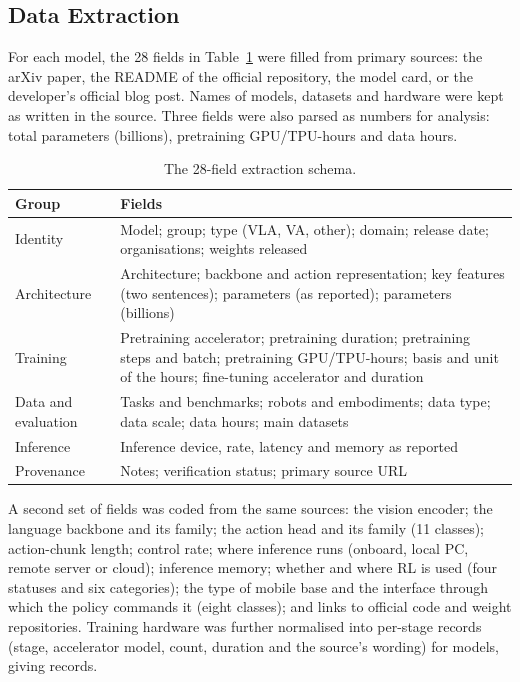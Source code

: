 \documentclass[applsci,review,submit,pdftex,oneauthor]{Definitions/mdpi}
\begin{document}
\subsection{Data Extraction}

For each model, the 28 fields in Table~\ref{tab:schema} were filled from primary sources: the arXiv paper, the README of the official repository, the model card, or the developer's official blog post. Names of models, datasets and hardware were kept as written in the source. Three fields were also parsed as numbers for analysis: total parameters (billions), pretraining GPU/TPU-hours and data hours.

\begin{table}[H]
\caption{The 28-field extraction schema.\label{tab:schema}}
\small
\begin{tabularx}{\textwidth}{@{}l X@{}}
\toprule
\textbf{Group} & \textbf{Fields}\\
\midrule
Identity & Model; group; type (VLA, VA, other); domain; release date; organisations; weights released\\
Architecture & Architecture; backbone and action representation; key features (two sentences); parameters (as reported); parameters (billions)\\
Training & Pretraining accelerator; pretraining duration; pretraining steps and batch; pretraining GPU/TPU-hours; basis and unit of the hours; fine-tuning accelerator and duration\\
Data and evaluation & Tasks and benchmarks; robots and embodiments; data type; data scale; data hours; main datasets\\
Inference & Inference device, rate, latency and memory as reported\\
Provenance & Notes; verification status; primary source URL\\
\bottomrule
\end{tabularx}
\end{table}

A second set of fields was coded from the same sources: the vision encoder; the language backbone and its family; the action head and its family (11 classes); action-chunk length; control rate; where inference runs (onboard, local PC, remote server or cloud); inference memory; whether and where RL is used (four statuses and six categories); the type of mobile base and the interface through which the policy commands it (eight classes); and links to official code and weight repositories. Training hardware was further normalised into per-stage records (stage, accelerator model, count, duration and the source's wording) for \nTGmodels{} models, giving \nTGrecords{} records.
\end{document}
